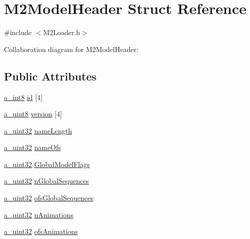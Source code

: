 \hypertarget{struct_m2_model_header}{\section{M2\+Model\+Header Struct Reference}
\label{struct_m2_model_header}
}


{\ttfamily \#include $<$M2\+Loader.\+h$>$}



Collaboration diagram for M2\+Model\+Header\+:
\subsection*{Public Attributes}
\begin{DoxyCompactItemize}
\item 
\hyperlink{_common_defines_8h_a29a7f712ca0e13d1cc6485d440fd7ca5}{a\+\_\+int8} \hyperlink{struct_m2_model_header_a90c1d7753c6d4ea30d42beb9f665f638}{id} \mbox{[}4\mbox{]}
\item 
\hyperlink{_common_defines_8h_afbe6c09973474a1f78f870f39073398f}{a\+\_\+uint8} \hyperlink{struct_m2_model_header_abc5ecbfc181df8f85601867c1babd152}{version} \mbox{[}4\mbox{]}
\item 
\hyperlink{_common_defines_8h_a964296f9770051b9e4807b1f180dd416}{a\+\_\+uint32} \hyperlink{struct_m2_model_header_ab31e905c422d5d28c6570005a80c46bd}{name\+Length}
\item 
\hyperlink{_common_defines_8h_a964296f9770051b9e4807b1f180dd416}{a\+\_\+uint32} \hyperlink{struct_m2_model_header_ab94c7d89760d5ed82f87c59c1304e49b}{name\+Ofs}
\item 
\hyperlink{_common_defines_8h_a964296f9770051b9e4807b1f180dd416}{a\+\_\+uint32} \hyperlink{struct_m2_model_header_a010c288d6013c7fd8b18ae6754fa24fe}{Global\+Model\+Flags}
\item 
\hyperlink{_common_defines_8h_a964296f9770051b9e4807b1f180dd416}{a\+\_\+uint32} \hyperlink{struct_m2_model_header_ab1b26eeb02f5f8c0416d894521b796ed}{n\+Global\+Sequences}
\item 
\hyperlink{_common_defines_8h_a964296f9770051b9e4807b1f180dd416}{a\+\_\+uint32} \hyperlink{struct_m2_model_header_ac5b161bb1a878693c99c9a442e01298c}{ofs\+Global\+Sequences}
\item 
\hyperlink{_common_defines_8h_a964296f9770051b9e4807b1f180dd416}{a\+\_\+uint32} \hyperlink{struct_m2_model_header_a2a9b729d4fc69016c70fcf404ec03f43}{n\+Animations}
\item 
\hyperlink{_common_defines_8h_a964296f9770051b9e4807b1f180dd416}{a\+\_\+uint32} \hyperlink{struct_m2_model_header_afd6dfbed87c97908c9ad174d74c3b9e8}{ofs\+Animations}

\end{DoxyCompactItemize}
